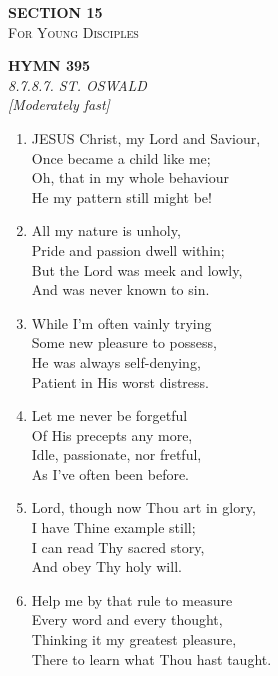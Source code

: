\newpage
\thispagestyle{empty}
\vspace*{3.5cm}
\begin{center}
    {\LARGE \textbf{SECTION 15}}\\[0.8em]
    {\Large \textsc{For Young Disciples}}
\end{center}
\vspace{3.5cm}

\newpage
\begin{center}
    {\Large \textbf{HYMN 395}}
    \\
    \textit{8.7.8.7. ST. OSWALD}
    \\
    \textit{\small [Moderately fast]}
\end{center}
\vspace{1em}

\begin{enumerate}
    \item JESUS Christ, my Lord and Saviour, \\
        Once became a child like me; \\
        Oh, that in my whole behaviour \\
        He my pattern still might be!

    \item All my nature is unholy, \\
        Pride and passion dwell within; \\
        But the Lord was meek and lowly, \\
        And was never known to sin.

    \item While I'm often vainly trying \\
        Some new pleasure to possess, \\
        He was always self-denying, \\
        Patient in His worst distress.

    \item Let me never be forgetful \\
        Of His precepts any more, \\
        Idle, passionate, nor fretful, \\
        As I've often been before.

    \item Lord, though now Thou art in glory, \\
        I have Thine example still; \\
        I can read Thy sacred story, \\
        And obey Thy holy will.

    \item Help me by that rule to measure \\
        Every word and every thought, \\
        Thinking it my greatest pleasure, \\
        There to learn what Thou hast taught.

\end{enumerate}

